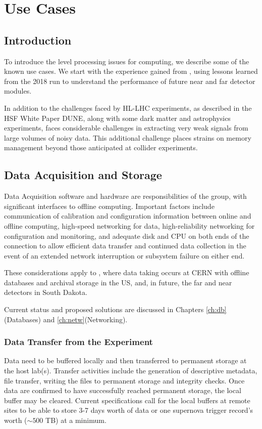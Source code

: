 \documentclass[../main-v1.tex]{subfiles}
\begin{document}
\chapter{Use Cases}
\label{ch:use}
\newcommand{\ignore}[1]{{}}



\section{Introduction}

To introduce the  level processing issues for  computing, we describe some of the known use cases.  We start with  the experience gained from  ,  using lessons learned from the 2018 run to understand the performance of future near and far detector modules. 

In addition to the challenges faced by HL-LHC experiments, as described in the HSF White Paper \cite{HEPSoftwareFoundation:2017ggl} DUNE, along with some dark matter and astrophysics experiments, faces considerable challenges in extracting very weak signals from large volumes of noisy data.  This additional challenge places strains on memory management beyond those anticipated at collider experiments. 

\section{Data Acquisition and Storage}

Data Acquisition software and hardware are responsibilities of the  group, with significant interfaces to offline computing. Important factors include communication of calibration and configuration information between online and offline computing, high-speed networking for data, high-reliability networking for configuration and monitoring, and adequate disk and CPU on both ends of the connection to allow efficient data transfer and continued data collection in the event of an extended network interruption or subsystem failure on either end.

These considerations apply to , where data taking occurs at CERN with offline databases and archival storage in the US,  and, in future, the far and near detectors in South Dakota. 

Current status and proposed solutions are discussed in Chapters \ref{ch:db}(Databases) and \ref{ch:netw}(Networking). 

\subsection{Data Transfer from the Experiment}
Data need to be buffered locally and then transferred to permanent storage at the host lab(s).  Transfer activities include the generation of descriptive metadata, file transfer, writing the files to permanent storage and integrity checks.  Once data are confirmed to have successfully reached permanent storage, the local buffer may be cleared.  Current specifications call for the local buffers at remote sites to be able to store 3-7 days worth of data or one supernova trigger record's worth ($\sim 500$ TB) at a minimum. 
\end{document}
